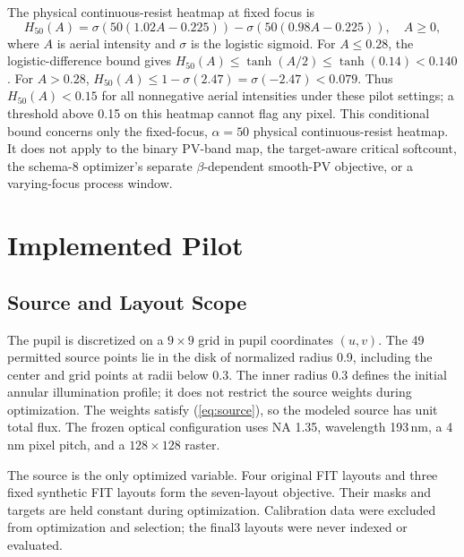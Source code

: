 \documentclass[conference]{IEEEtran}
\begin{document}
The physical continuous-resist heatmap at fixed focus is
\begin{equation}
 H_{50}(A)=\sigma\!\left(50(1.02A-0.225)\right)
          -\sigma\!\left(50(0.98A-0.225)\right),\quad A\geq0,
 \label{eq:physicalheatmap}
\end{equation}
where $A$ is aerial intensity and $\sigma$ is the logistic sigmoid. For $A\leq0.28$, the logistic-difference bound gives $H_{50}(A)\leq\tanh(A/2)\leq\tanh(0.14)<0.140$. For $A>0.28$, $H_{50}(A)\leq1-\sigma(2.47)=\sigma(-2.47)<0.079$. Thus $H_{50}(A)<0.15$ for all nonnegative aerial intensities under these pilot settings; a threshold above 0.15 on this heatmap cannot flag any pixel. This conditional bound concerns only the fixed-focus, $\alpha=50$ physical continuous-resist heatmap. It does not apply to the binary PV-band map, the target-aware critical softcount, the schema-8 optimizer's separate $\beta$-dependent smooth-PV objective, or a varying-focus process window.

\section{Implemented Pilot}
\subsection{Source and Layout Scope}
The pupil is discretized on a $9\times9$ grid in pupil coordinates $(u,v)$. The 49 permitted source points lie in the disk of normalized radius 0.9, including the center and grid points at radii below 0.3. The inner radius 0.3 defines the initial annular illumination profile; it does not restrict the source weights during optimization. The weights satisfy (\ref{eq:source}), so the modeled source has unit total flux. The frozen optical configuration uses NA 1.35, wavelength 193\,nm, a 4\,nm pixel pitch, and a $128\times128$ raster.

The source is the only optimized variable. Four original FIT layouts and three fixed synthetic FIT layouts form the seven-layout objective. Their masks and targets are held constant during optimization. Calibration data were excluded from optimization and selection; the final3 layouts were never indexed or evaluated.
\end{document}
